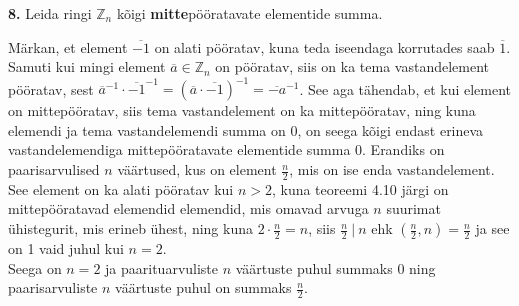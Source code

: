 \documentclass[a4paper, 10pt]{article}
\newcommand{\Z}{\mathbb{Z}}
\newcommand{\w}{\overline}
\begin{document}
\noindent \textbf{8.} Leida ringi $\Z_n$ kõigi {\bf mitte}pööratavate elementide summa. 

\bigskip
Märkan, et element $\w{-1}$ on alati pööratav, kuna teda iseendaga korrutades saab $\w1$. Samuti kui mingi element $\w a\in\Z_n$ on pööratav, siis on ka tema vastandelement pööratav, sest $\w a^{-1}\cdot \w{-1}^{-1}=(\w a\cdot\w{-1})^{-1}=\w{-a}^{-1}$. See aga tähendab, et kui element on mittepööratav, siis tema vastandelement on ka mittepööratav, ning kuna elemendi ja tema vastandelemendi summa on 0, on seega kõigi endast erineva vastandelemendiga mittepööratavate elementide summa 0. Erandiks on paarisarvulised $n$ väärtused, kus on element $\frac n2$, mis on ise enda vastandelement. See element on ka alati pööratav kui $n>2$, kuna teoreemi 4.10 järgi on mittepööratavad elemendid elemendid, mis omavad arvuga $n$ suurimat ühistegurit, mis erineb ühest, ning kuna $2\cdot\frac n2=n$, siis $\frac n2\ |\ n$ ehk $(\frac n2,n)=\frac n2$ ja see on 1 vaid juhul kui $n=2$.\\
Seega on $n=2$ ja paarituarvuliste $n$ väärtuste puhul summaks 0 ning paarisarvuliste $n$ väärtuste puhul on summaks $\frac n2$.
\bigskip
\end{document}
